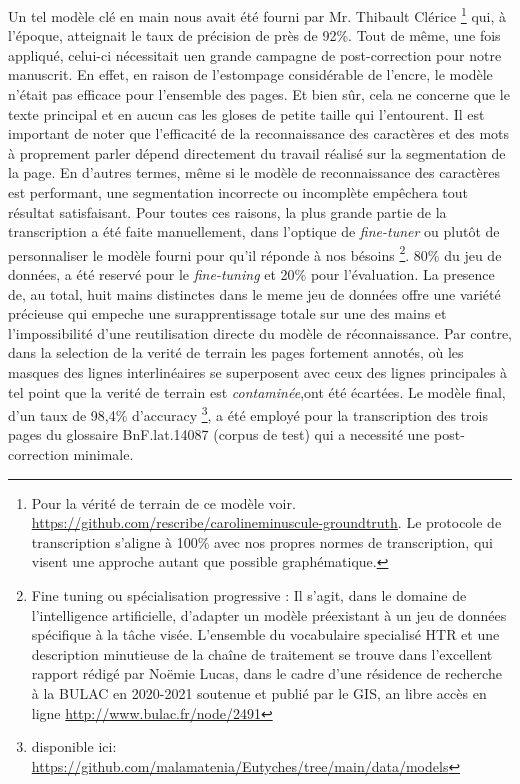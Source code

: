 \documentclass[a4paper, twoside, 12pt]{book}
\begin{document}
Un tel modèle \og{} clé en main \fg{} nous avait été fourni par Mr. Thibault Clérice \footnote{Pour la vérité de terrain de ce modèle voir. \url{https://github.com/rescribe/carolineminuscule-groundtruth}. Le protocole de transcription s'aligne à 100\% avec nos propres normes de transcription, qui visent une approche autant que possible graphématique.} qui, à l'époque, atteignait le taux de précision  de près de 92\%. Tout de même, une fois appliqué, celui-ci  nécessitait
uen grande campagne de post-correction pour notre manuscrit. En effet, en raison de l'estompage considérable de l'encre, le modèle n'était pas efficace pour l'ensemble des pages. Et bien sûr, cela ne concerne que le texte principal et en aucun cas les gloses de petite taille qui l'entourent. Il est important de noter que l’efficacité de la reconnaissance des caractères et des mots à proprement parler dépend directement du travail réalisé sur la segmentation de la page. En d’autres termes, même si le modèle de reconnaissance des caractères est performant, une segmentation incorrecte ou
incomplète empêchera tout résultat satisfaisant. Pour toutes ces raisons, la plus grande partie de la transcription a été faite manuellement, dans l'optique de \textit{fine-tuner} ou plutôt de personnaliser le modèle fourni pour qu'il réponde à nos bésoins \footnote{ \og{} Fine tuning ou spécialisation progressive : Il s’agit, dans le domaine de l’intelligence artificielle, d’adapter un modèle préexistant à un jeu de données spécifique à la tâche visée.\fg{} L'ensemble du vocabulaire specialisé HTR et une description minutieuse de la chaîne de traitement se trouve dans l'excellent rapport rédigé par Noëmie Lucas, dans le cadre d'une résidence de recherche à la BULAC en 2020-2021 soutenue et publié par le GIS, an libre accès en ligne \url{http://www.bulac.fr/node/2491}
}. 80\% du jeu de données, a été reservé pour le \textit{fine-tuning} et 20\% pour l'évaluation. La presence de, au total, huit mains distinctes dans le meme jeu de données offre une variété précieuse qui empeche une surapprentissage totale sur une des mains et l'impossibilité d'une reutilisation directe du modèle de réconnaissance. Par contre, dans la selection de la verité de terrain les pages fortement annotés, où les masques des lignes interlinéaires se superposent avec ceux des lignes principales à tel point  que la verité de terrain est \textit{contaminée},ont été écartées. Le modèle final, d'un taux de 98,4\% d'accuracy \footnote{disponible ici: \url{https://github.com/malamatenia/Eutyches/tree/main/data/models}}, a été employé pour la transcription des trois pages du glossaire BnF.lat.14087 (corpus de test) qui a necessité une post-correction minimale. \\
\end{document}
